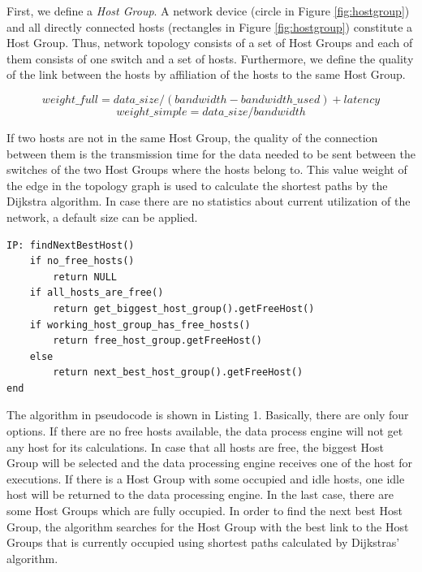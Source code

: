 First, we define a \textit{Host Group}. A network device (circle in Figure \ref{fig:hostgroup}) and all
directly connected hosts (rectangles in Figure \ref{fig:hostgroup}) constitute a Host Group.
Thus, network topology consists of a set of Host Groups and each of them consists of one switch and
a set of hosts. Furthermore, we define the quality of the link between the hosts by affiliation of
the hosts to the same Host Group.

\begin{equation}
    weight\_full = data\_size / (bandwidth - bandwidth\_used) + latency
\end{equation}
\begin{equation}
    weight\_simple = data\_size / bandwidth
\end{equation}

If two hosts are not in the same Host Group, the quality of the connection between them is the
transmission time for the data needed to be sent between the switches of the two Host Groups where
the hosts belong to. This value weight of the edge in the topology graph is used to calculate the
shortest paths by the Dijkstra algorithm. In case there are no statistics about current utilization
of the network, a default size can be applied.\\

\begin{lstlisting}[caption=Algorithm of finding free hosts based on Host Group concept]
IP: findNextBestHost()
    if no_free_hosts()
        return NULL
    if all_hosts_are_free()
        return get_biggest_host_group().getFreeHost()
    if working_host_group_has_free_hosts()
        return free_host_group.getFreeHost()
    else
        return next_best_host_group().getFreeHost()
end
\end{lstlisting}

The algorithm in pseudocode is shown in Listing 1. Basically, there are only four options. If
there are no free hosts available, the data process engine will not get any host for its
calculations. In case that all hosts are free, the biggest Host Group will be selected and the data
processing engine receives one of the host for executions. If there is a Host Group with some
occupied and idle hosts, one idle host will be returned to the data processing engine. In the last
case, there are some Host Groups which are fully occupied. In order to find the next best Host
Group, the algorithm searches for the Host Group with the best link to the Host Groups that is
currently occupied using shortest paths calculated by Dijkstras' algorithm.

